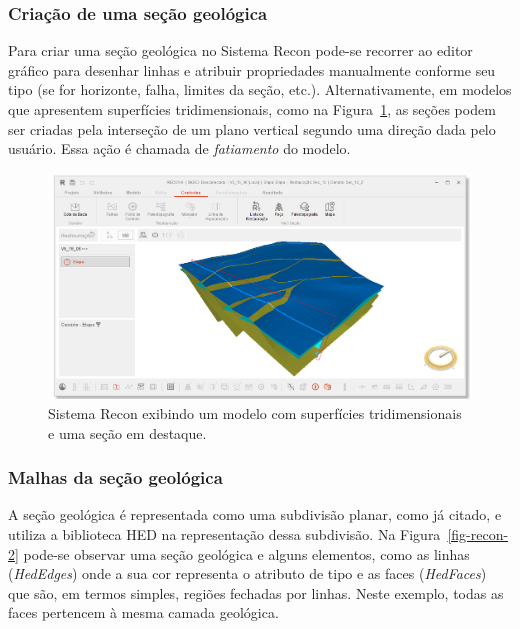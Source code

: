 \subsubsection{Criação de uma seção geológica}\label{item-section-creation}

Para criar uma seção geológica no Sistema Recon pode-se recorrer ao editor gráfico para desenhar linhas e atribuir propriedades manualmente conforme seu tipo (se for horizonte, falha, limites da seção, etc.). Alternativamente, em modelos que apresentem superfícies tridimensionais, como na Figura~\ref{fig-recon-1}, as seções podem ser criadas pela interseção de um plano vertical segundo uma direção dada pelo usuário. Essa ação é chamada de \textit{fatiamento} do modelo.

\begin{figure} [H]
  \begin{center}
    \includegraphics[width=\textwidth]{images/fig-recon-1}
    \caption{Sistema Recon exibindo um modelo com superfícies tridimensionais e uma seção em destaque.}\label{fig-recon-1}
  \end{center}
\end{figure}

\subsubsection{Malhas da seção geológica}

A seção geológica é representada como uma subdivisão planar, como já citado, e utiliza a biblioteca HED na representação dessa subdivisão. Na Figura~\ref{fig-recon-2} pode-se observar uma seção geológica e alguns elementos, como as linhas (\textit{HedEdges}) onde a sua cor representa o atributo de tipo e as faces (\textit{HedFaces}) que são, em termos simples, regiões fechadas por linhas. Neste exemplo, todas as faces pertencem à mesma camada geológica.

